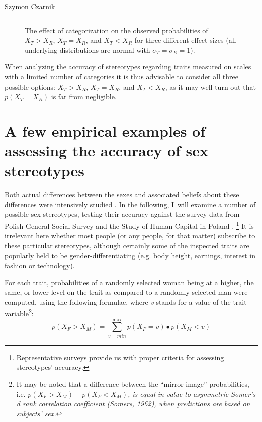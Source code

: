 \begin{artengenv}{Szymon Czarnik}
\begin{figure}[H]
\begin{small}
\begin{supertabular}{m{.32\textwidth}m{.32\textwidth}m{.32\textwidth}}
   \end{supertabular}
   \end{small}
\caption{The effect of categorization on the observed
probabilities of \(X_{T} > X_{R}\), \(X_{T} = X_{R}\), and
\(X_{T} < X_{R}\) for three different effect sizes (all underlying
distributions are normal with \(\sigma_{T} = \sigma_{R} = 1\)).}\label{fig2-czar}
\end{figure}
When analyzing the accuracy of stereotypes regarding traits measured on
scales with a limited number of categories it is thus advisable to
consider all three possible options: \(X_{T} > X_{R}\),
\(X_{T} = X_{R}\), and \(X_{T} < X_{R}\), as it may well turn out that
\(p\left( X_{T} = X_{R} \right)\) is far from negligible.

\section{A few empirical examples of assessing the accuracy of sex stereotypes}
\enlargethispage{-2\baselineskip}
Both actual differences between the sexes and associated beliefs about these differences were intensively studied
\parencites[][]{williams_measuring_1982}[][]{williams_sex_1990}[][]{costa_gender_2001}[][]{borgatta_sex_2000}[][]{buss_evolution_2003}[][]{pinker_blank_2003}. %
 In the following, I~will examine a number of possible sex stereotypes, testing their accuracy against the survey data from Polish General Social Survey 
\parencite[][]{cichomski_polskie_2013} %
 and the Study of Human Capital in Poland 
\parencites[][]{gorniak_bilans_2015}[][]{gorniak_bilans_2019}.%
\footnote{Representative surveys provide us with proper criteria for assessing stereotypes' accuracy. } It is irrelevant here whether most people (or any people, for that matter) subscribe to these particular stereotypes, although certainly some of the inspected traits are popularly held to be gender-differentiating (e.g. body height, earnings, interest in fashion or technology).

For each trait, probabilities of a randomly selected woman being at a
higher, the same, or lower level on the trait as compared to a randomly
selected man were computed, using the following formulae, where \emph{v}
stands for a value of the trait variable\footnote{It may be noted that a
  difference between the ``mirror-image'' probabilities, i.e.
  \(p\left( X_{F} > X_{M} \right) - p\left( X_{F} < X_{M} \right)\)\emph{,
  is equal in value to asymmetric Somer's d rank correlation coefficient
  (Somers, 1962), when predictions are based on subjects' sex.}}:
\[p\left( X_{F} > X_{M} \right) = \sum_{v = min}^{\max}{p\left( X_{F} = v \right) \bullet p\left( X_{M} < v \right)}\]


\end{artengenv}
